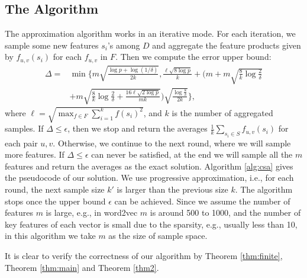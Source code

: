 \documentclass[sigconf,anonymous]{acmart}
\begin{document}
\subsection{The Algorithm}
The approximation algorithm works in an iterative mode. For each iteration, we sample some new features $s_i$'s among $D$ and aggregate the feature products given by $f_{u,v}(s_i)$ for each $f_{u,v}$ in $F$. Then we compute the error upper bound:
$$\begin{aligned}
\Delta = &\min\bigg\{m\sqrt{\frac{\log p + \log(1/\delta)}{2k}}, \frac{\ell\sqrt{8\log p}}{k} +\bigg(m+m\sqrt{\frac{8}{k}\log \frac{2}{\delta}} \\&+ m\sqrt{\frac{8}{k}\log \frac{2}{\delta} + \frac{16\ell\sqrt{2\log p}}{mk}}\bigg)\sqrt{\frac{\log \frac{8}{\delta}}{2k}}\bigg\},
\end{aligned}$$
where $\ell = \sqrt{\max_{f\in F} \sum_{i=1}^k f(s_i)^2}$, and $k$ is the number of aggregated samples. 
If $\Delta \leq \epsilon$, then we stop and return the averages $\frac{1}{k}\sum_{s_i\in S}f_{u,v}(s_i)$ for each pair $u, v$. Otherwise, we continue to the next round, where we will sample more features. If $\Delta \leq \epsilon$ can never be satisfied, at the end we will sample all the $m$ features and return the averages as the exact solution. Algorithm \ref{alg:csa} gives the pseudocode of our solution. We use progressive approximation, i.e., for each round, the next sample size $k'$ is larger than the previous size $k$. The algorithm stops once the upper bound $\epsilon$ can be achieved. Since we assume the number of features $m$ is large, e.g., in word2vec $m$ is around 500 to 1000, and the number of key features of each vector is small due to the sparsity, e.g., usually less than 10, in this algorithm we take $m$ as the size of sample space.

It is clear to verify the correctness of our algorithm by Theorem \ref{thm:finite}, Theorem \ref{thm:main} and Theorem \ref{thm2}.
\end{document}
